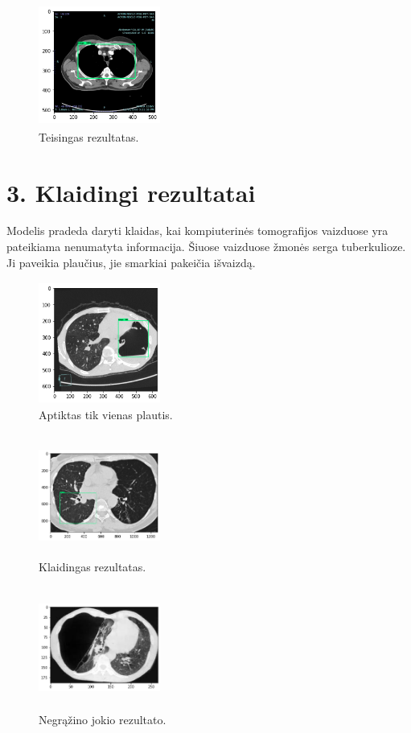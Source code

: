 \documentclass{VUMIFInfKursinis}
\begin{document}
\begin{figure}[ht]
  \centering
  \includegraphics[width=4cm,height=4cm,keepaspectratio]{duom3.png}
  \caption{Teisingas rezultatas.}
  \label{fig:kaukė1}
\end{figure} 

\section*{3. Klaidingi rezultatai}
\par
Modelis pradeda daryti klaidas, kai kompiuterinės tomografijos vaizduose yra pateikiama nenumatyta informacija. Šiuose vaizduose žmonės serga tuberkulioze. Ji paveikia plaučius, jie smarkiai pakeičia išvaizdą.

\begin{figure}[ht]
  \centering
  \includegraphics[width=4cm,height=4cm,keepaspectratio]{tub1.png}
  \caption{Aptiktas tik vienas plautis.}
  \label{fig:kaukė1}
\end{figure} 

\begin{figure}[ht]
  \centering
  \includegraphics[width=4cm,height=4cm,keepaspectratio]{tub2.png}
  \caption{Klaidingas rezultatas.}
  \label{fig:kaukė1}
\end{figure} 
 
\begin{figure}[ht]
  \centering
  \includegraphics[width=4cm,height=4cm,keepaspectratio]{tub3.png}
  \caption{Negrąžino jokio rezultato.}
  \label{fig:kaukė1}
\end{figure} 
\end{document}
